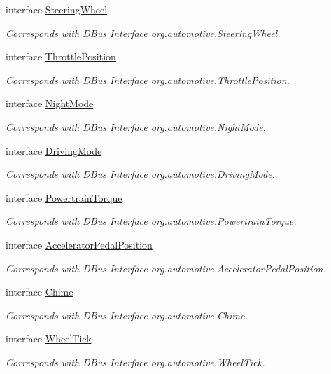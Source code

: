 \begin{DoxyCompactItemize}
interface \hyperlink{interfaceSteeringWheel}{Steering\+Wheel}
\begin{DoxyCompactList}\small\item\em Corresponds with D\+Bus Interface org.\+automotive.\+Steering\+Wheel. \end{DoxyCompactList}\item 
interface \hyperlink{interfaceThrottlePosition}{Throttle\+Position}
\begin{DoxyCompactList}\small\item\em Corresponds with D\+Bus Interface org.\+automotive.\+Throttle\+Position. \end{DoxyCompactList}\item 
interface \hyperlink{interfaceNightMode}{Night\+Mode}
\begin{DoxyCompactList}\small\item\em Corresponds with D\+Bus Interface org.\+automotive.\+Night\+Mode. \end{DoxyCompactList}\item 
interface \hyperlink{interfaceDrivingMode}{Driving\+Mode}
\begin{DoxyCompactList}\small\item\em Corresponds with D\+Bus Interface org.\+automotive.\+Driving\+Mode. \end{DoxyCompactList}\item 
interface \hyperlink{interfacePowertrainTorque}{Powertrain\+Torque}
\begin{DoxyCompactList}\small\item\em Corresponds with D\+Bus Interface org.\+automotive.\+Powertrain\+Torque. \end{DoxyCompactList}\item 
interface \hyperlink{interfaceAcceleratorPedalPosition}{Accelerator\+Pedal\+Position}
\begin{DoxyCompactList}\small\item\em Corresponds with D\+Bus Interface org.\+automotive.\+Accelerator\+Pedal\+Position. \end{DoxyCompactList}\item 
interface \hyperlink{interfaceChime}{Chime}
\begin{DoxyCompactList}\small\item\em Corresponds with D\+Bus Interface org.\+automotive.\+Chime. \end{DoxyCompactList}\item 
interface \hyperlink{interfaceWheelTick}{Wheel\+Tick}
\begin{DoxyCompactList}\small\item\em Corresponds with D\+Bus Interface org.\+automotive.\+Wheel\+Tick. \end{DoxyCompactList}\item 

\end{DoxyCompactItemize}
